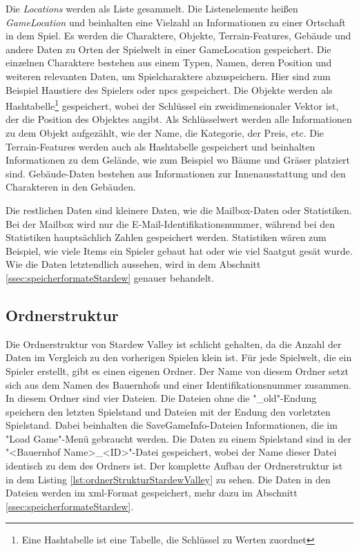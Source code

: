 Die \textit{Locations} werden als Liste gesammelt. Die Listenelemente heißen \textit{GameLocation} und beinhalten eine Vielzahl an Informationen zu einer Ortschaft in dem Spiel. Es werden die Charaktere, Objekte, Terrain-Features, Gebäude und andere Daten zu Orten der Spielwelt in einer GameLocation gespeichert. Die einzelnen Charaktere bestehen aus einem Typen, Namen, deren Position und weiteren relevanten Daten, um Spielcharaktere abzuspeichern. Hier sind zum Beispiel Haustiere des Spielers oder \acp{npc} gespeichert. Die Objekte werden als Hashtabelle\footnote{Eine Hashtabelle ist eine Tabelle, die Schlüssel zu Werten zuordnet} gespeichert, wobei der Schlüssel ein zweidimensionaler Vektor ist, der die Position des Objektes angibt. Als Schlüsselwert werden alle Informationen zu dem Objekt aufgezählt, wie der Name, die Kategorie, der Preis, \ac{etc}. Die Terrain-Features werden auch als Hashtabelle gespeichert und beinhalten Informationen zu dem Gelände, wie zum Beispiel wo Bäume und Gräser platziert sind. Gebäude-Daten bestehen aus Informationen zur Innenausstattung und den Charakteren in den Gebäuden.

Die restlichen Daten sind kleinere Daten, wie die Mailbox-Daten oder Statistiken. Bei der Mailbox wird nur die E-Mail-Identifikationsnummer, während bei den Statistiken hauptsächlich Zahlen gespeichert werden. Statistiken wären zum Beispiel, wie viele Items ein Spieler gebaut hat oder wie viel Saatgut gesät wurde. Wie die Daten letztendlich aussehen, wird in dem Abschnitt \ref{ssec:speicherformateStardew} genauer behandelt.

\subsection{Ordnerstruktur}
Die Ordnerstruktur von Stardew Valley ist schlicht gehalten, da die Anzahl der Daten im Vergleich zu den vorherigen Spielen klein ist. Für jede Spielwelt, die ein Spieler erstellt, gibt es einen eigenen Ordner. Der Name von diesem Ordner setzt sich aus dem Namen des Bauernhofs und einer Identifikationsnummer zusammen. In diesem Ordner sind vier Dateien. Die Dateien ohne die "\_old"-Endung speichern den letzten Spielstand und Dateien mit der Endung den vorletzten Spielstand. Dabei beinhalten die SaveGameInfo-Dateien Informationen, die im "Load Game"-Menü gebraucht werden. Die Daten zu einem Spielstand sind in der "<Bauernhof Name>\_<ID>"-Datei gespeichert, wobei der Name dieser Datei identisch zu dem des Ordners ist. Der komplette Aufbau der Ordnerstruktur ist in dem Listing \ref{lst:ordnerStrukturStardewValley} zu sehen. Die Daten in den Dateien werden im \ac{xml}-Format gespeichert, mehr dazu im Abschnitt \ref{ssec:speicherformateStardew}.\cite{stardewvalleywikiSaves}\cite{stardewvalleyFiles}

